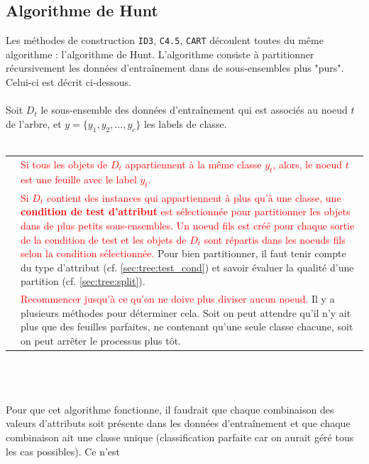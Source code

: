 \documentclass[letterpaper, 12pt]{article}
\newcommand{\alinea}{
\hspace*{0.5cm}}
\newcommand{\red}[1]{
	\textcolor{red}{#1}}
\newcommand{\myul}[1]{
		\underline{\smash{#1}}
	}
\begin{document}
		\subsection{Algorithme de Hunt}
			\alinea Les méthodes de construction \texttt{ID3}, \texttt{C4.5},
				\texttt{CART} découlent
				toutes du même algorithme : l'algorithme de Hunt. 
				L'algorithme consiste à partitionner récursivement 
				les données d'entraînement dans de sous-ensembles plus
				"purs". Celui-ci est décrit ci-dessous.\\
			~\\
			\alinea Soit $D_t$ le sous-ensemble des données 
				d'entraînement qui est associés au noeud $t$ de l'arbre, et 
				$y=\{y_1,y_2, \ldots, y_c\}$ les labels de classe.\\
			~\\
			\begin{tabular}{lp{15.5cm}}
			\myul{\textbf{\'Etape 1}} & \red{Si tous les objets de $D_t$
				appartiennent 
				à la même classe $y_t$, alors, le noeud $t$ est une feuille
				avec le label $y_t$.}\\
			\myul{\textbf{\'Etape 2}} & \red{Si $D_t$ contient des instances 
				qui appartiennent
				à plus qu'à une classe, une \textbf{condition de test
				d'attribut} est sélectionnée pour partitionner les objets
				dans de plus petits sous-ensembles. Un noeud fils est créé 
				pour chaque sortie de la condition de test et les objets
				de $D_t$ sont répartis dans les noeuds fils selon la 
				condition sélectionnée.} Pour bien partitionner, il faut
				tenir compte du type d'attribut 
				(cf. \ref{sec:tree:test_cond}) et savoir évaluer la qualité
				d'une partition (cf. \ref{sec:tree:split}).\\
			\myul{\textbf{\'Etape 3}} & \red{Recommencer jusqu'à ce qu'on
				ne doive plus diviser aucun noeud.} Il y a plusieurs méthodes
				pour déterminer cela. Soit on peut attendre qu'il n'y ait 
				plus que des feuilles parfaites, ne contenant qu'une seule
				classe chacune, soit on peut arrêter le processus plus tôt.
			\end{tabular}\noindent
			~\\~\\~\\
			\alinea Pour que cet algorithme fonctionne, il faudrait que
				chaque combinaison des valeurs d'attributs soit
				présente dans les données d'entraînement et que chaque 
				combinaison ait une classe unique (classification parfaite
				car on aurait géré tous les cas possibles). Ce n'est
\end{document}
